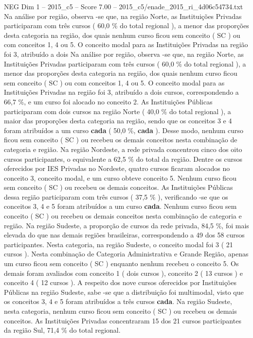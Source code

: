 \begin{textsample}{NEG Dim 1 – 2015\_c5 – Score 7.00 – 2015\_c5/enade\_2015\_ri\_4d06c54734.txt}
Na análise por região, observa -se que, na região Norte, as Instituições Privadas participaram com três cursos ( 60,0 \% do total regional ), a menor das proporções desta categoria na região, dos quais nenhum curso ficou sem conceito ( SC ) ou com conceitos 1, 4 ou 5.
O conceito modal para as Instituições Privadas na região foi 3, atribuído a dois Na análise por região, observa -se que, na região Norte, as Instituições Privadas participaram com três cursos ( 60,0 \% do total regional ), a menor das proporções desta categoria na região, dos quais nenhum curso ficou sem conceito ( SC ) ou com conceitos 1, 4 ou 5.
O conceito modal para as Instituições Privadas na região foi 3, atribuído a dois cursos, correspondendo a 66,7 \%, e um curso foi alocado no conceito 2.
As Instituições Públicas participaram com dois cursos na região Norte ( 40,0 \% do total regional ), a maior das proporções desta categoria na região, sendo que os conceitos 3 e 4 foram atribuídos a um curso \textbf{cada} ( 50,0 \%, \textbf{cada} ).
Desse modo, nenhum curso ficou sem conceito ( SC ) ou recebeu os demais conceitos nesta combinação de categoria e região.
Na região Nordeste, a rede privada concentrou cinco dos oito cursos participantes, o equivalente a 62,5 \% do total da região.
Dentre os cursos oferecidos por IES Privadas no Nordeste, quatro cursos ficaram alocados no conceito 3, conceito modal, e um curso obteve conceito 5.
Nenhum curso ficou sem conceito ( SC ) ou recebeu os demais conceitos.
As Instituições Públicas dessa região participaram com três cursos ( 37,5 \% ), verificando -se que os conceitos 3, 4 e 5 foram atribuídos a um curso \textbf{cada}.
Nenhum curso ficou sem conceito ( SC ) ou recebeu os demais conceitos nesta combinação de categoria e região.
Na região Sudeste, a proporção de cursos da rede privada, 84,5 \%, foi mais elevada do que nas demais regiões brasileiras, correspondendo a 49 dos 58 cursos participantes.
Nesta categoria, na região Sudeste, o conceito modal foi 3 ( 21 cursos ).
Nesta combinação de Categoria Administrativa e Grande Região, apenas um curso ficou sem conceito ( SC ) enquanto nenhum recebeu o conceito 5.
Os demais foram avaliados com conceito 1 ( dois cursos ), conceito 2 ( 13 cursos ) e conceito 4 ( 12 cursos ).
A respeito dos nove cursos oferecidos por Instituições Públicas na região Sudeste, sabe -se que a distribuição foi multimodal, visto que os conceitos 3, 4 e 5 foram atribuídos a três cursos \textbf{cada}.
Na região Sudeste, nesta categoria, nenhum curso ficou sem conceito ( SC ) ou recebeu os demais conceitos.
As Instituições Privadas concentraram 15 dos 21 cursos participantes da região Sul, 71,4 \% do total regional.

\end{textsample}
